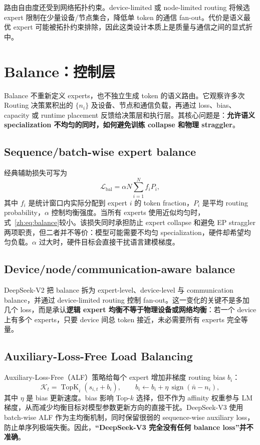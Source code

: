 \documentclass[10pt,a4paper,fontset=none]{ctexart}
\newcommand{\term}[1]{\textbf{#1}}
\begin{document}
路由自由度还受到网络拓扑约束。device-limited 或 node-limited routing 将候选 expert 限制在少量设备/节点集合，降低单 token 的通信 fan-out。代价是语义最优 expert 可能被拓扑约束排除，因此这类设计本质上是质量与通信之间的显式折中。

\section{Balance：控制层}

Balance 不重新定义 experts，也不独立生成 token 的语义路由。它观察许多次 Routing 决策累积出的 $\{n_i\}$ 及设备、节点和通信负载，再通过 loss、bias、capacity 或 runtime placement 反馈给决策层和执行层。其核心问题是：\term{允许语义 specialization 不均匀的同时，如何避免训练 collapse 和物理 straggler}。

\subsection{Sequence/batch-wise expert balance}

经典辅助损失可写为
\begin{equation}
  \mathcal{L}_{\mathrm{bal}}=\alpha N\sum_{i=1}^{N} f_i P_i,
  \label{zh:eq:balance}
\end{equation}
其中 $f_i$ 是统计窗口内实际分配到 expert $i$ 的 token fraction，$P_i$ 是平均 routing probability，$\alpha$ 控制均衡强度。当所有 experts 使用近似均匀时，式~\eqref{zh:eq:balance}较小。该损失同时承担防止 expert collapse 和避免 EP straggler 两项职责，但二者并不等价：模型可能需要不均匀 specialization，硬件却希望均匀负载。$\alpha$ 过大时，硬件目标会直接干扰语言建模梯度。

\subsection{Device/node/communication-aware balance}

DeepSeek-V2 把 balance 拆为 expert-level、device-level 与 communication balance，并通过 device-limited routing 控制 fan-out\cite{zh:deepseekv2}。这一变化的关键不是多加几个 loss，而是承认\term{逻辑 expert 均衡不等于物理设备或网络均衡}：若一个 device 上有多个 experts，只要 device 间总 token 接近，未必需要所有 experts 完全等量。

\subsection{Auxiliary-Loss-Free Load Balancing}

Auxiliary-Loss-Free（ALF）策略给每个 expert 增加非梯度 routing bias $b_i$：
\begin{equation}
  \mathcal{K}_t=\operatorname{TopK}_i(s_{i,t}+b_i),\qquad
  b_i\leftarrow b_i+\eta\,\operatorname{sign}(\bar n-n_i),
  \label{zh:eq:alf}
\end{equation}
其中 $\eta$ 是 bias 更新速度。bias 影响 Top-$k$ 选择，但不作为 affinity 权重参与 LM 梯度，从而减少均衡目标对模型参数更新方向的直接干扰\cite{zh:wang2024auxfree}。DeepSeek-V3 使用 batch-wise ALF 作为主均衡机制，同时保留很弱的 sequence-wise auxiliary loss，防止单序列极端失衡\cite{zh:deepseekv3}。因此，\term{“DeepSeek-V3 完全没有任何 balance loss”并不准确}。
\end{document}
